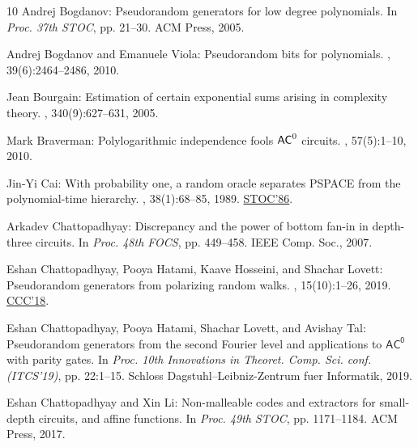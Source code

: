 \documentclass[11pt]{article}
\numberwithin{equation}{section}
\theoremstyle{definition}
\theoremstyle{plain}
\theoremstyle{plain}
\begin{document}
\begin{thebibliography}{10}
{\sc Andrej Bogdanov}: Pseudorandom generators for low degree polynomials.
\newblock In {\em Proc. 37th STOC}, pp. 21--30. ACM Press, 2005.
\newblock [\epfmtdoi{10.1145/1060590.1060594}]

{\sc Andrej Bogdanov and Emanuele Viola}: Pseudorandom bits for polynomials.
, 39(6):2464--2486, 2010.
\newblock [\epfmtdoi{10.1137/070712109}]

{\sc Jean Bourgain}: Estimation of certain exponential sums arising in
  complexity theory.
, 340(9):627--631, 2005.

{\sc Mark Braverman}: Polylogarithmic independence fools {${\sf AC}^0$}
  circuits.
, 57(5):1--10, 2010.
\newblock [\epfmtdoi{10.1145/1754399.1754401}]

{\sc Jin{-}Yi Cai}: With probability one, a random oracle separates {{\sf
  {PSPACE}}} from the polynomial-time hierarchy.
, 38(1):68--85, 1989.
\newblock \prelim \href{https://doi.org/10.1145/12130.12133}{STOC'86}.
\newblock [\epfmtdoi{10.1016/0022-0000(89)90033-0}]

{\sc Arkadev Chattopadhyay}: Discrepancy and the power of bottom fan-in in
  depth-three circuits.
\newblock In {\em Proc. 48th FOCS}, pp. 449--458. IEEE Comp. Soc., 2007.

{\sc Eshan Chattopadhyay, Pooya Hatami, Kaave Hosseini, and Shachar Lovett}:
  Pseudorandom generators from polarizing random walks.
, 15(10):1--26, 2019.
\newblock \prelim \href{https://doi.org/10.4230/LIPIcs.CCC.2018.1}{CCC'18}.

{\sc Eshan Chattopadhyay, Pooya Hatami, Shachar Lovett, and Avishay Tal}:
  Pseudorandom generators from the second {F}ourier level and applications to
  {$\mathsf{AC^0}$} with parity gates.
\newblock In {\em Proc. 10th Innovations in Theoret. Comp. Sci. conf.
  (ITCS'19)}, pp. 22:1--15. Schloss Dagstuhl--Leibniz-Zentrum fuer Informatik,
  2019.

{\sc Eshan Chattopadhyay and Xin Li}: Non-malleable codes and extractors for
  small-depth circuits, and affine functions.
\newblock In {\em Proc. 49th STOC}, pp. 1171--1184. ACM Press, 2017.
\newblock [\epfmtdoi{10.1145/3055399.3055483}]


\end{thebibliography}
\end{document}
